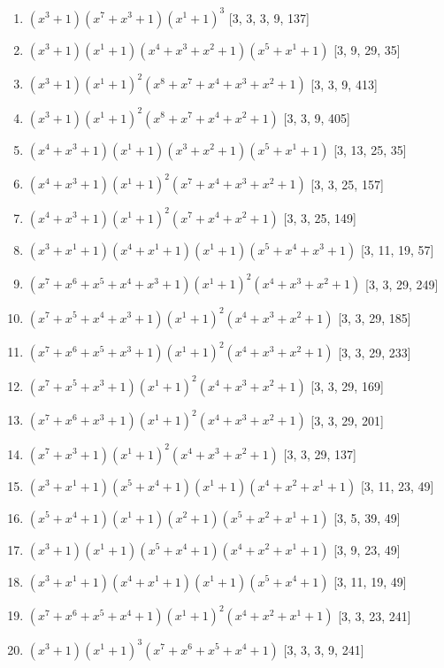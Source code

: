 \documentclass[10pt,twocolumn]{article}
\begin{document}
\begin{enumerate}
\item $(x^{3} + 1)(x^{7} + x^{3} + 1)(x^{1} + 1)^{3}$  [3, 3, 3, 9, 137]
\item $(x^{3} + 1)(x^{1} + 1)(x^{4} + x^{3} + x^{2} + 1)(x^{5} + x^{1} + 1)$  [3, 9, 29, 35]
\item $(x^{3} + 1)(x^{1} + 1)^{2}(x^{8} + x^{7} + x^{4} + x^{3} + x^{2} + 1)$  [3, 3, 9, 413]
\item $(x^{3} + 1)(x^{1} + 1)^{2}(x^{8} + x^{7} + x^{4} + x^{2} + 1)$  [3, 3, 9, 405]
\item $(x^{4} + x^{3} + 1)(x^{1} + 1)(x^{3} + x^{2} + 1)(x^{5} + x^{1} + 1)$  [3, 13, 25, 35]
\item $(x^{4} + x^{3} + 1)(x^{1} + 1)^{2}(x^{7} + x^{4} + x^{3} + x^{2} + 1)$  [3, 3, 25, 157]
\item $(x^{4} + x^{3} + 1)(x^{1} + 1)^{2}(x^{7} + x^{4} + x^{2} + 1)$  [3, 3, 25, 149]
\item $(x^{3} + x^{1} + 1)(x^{4} + x^{1} + 1)(x^{1} + 1)(x^{5} + x^{4} + x^{3} + 1)$  [3, 11, 19, 57]
\item $(x^{7} + x^{6} + x^{5} + x^{4} + x^{3} + 1)(x^{1} + 1)^{2}(x^{4} + x^{3} + x^{2} + 1)$  [3, 3, 29, 249]
\item $(x^{7} + x^{5} + x^{4} + x^{3} + 1)(x^{1} + 1)^{2}(x^{4} + x^{3} + x^{2} + 1)$  [3, 3, 29, 185]
\item $(x^{7} + x^{6} + x^{5} + x^{3} + 1)(x^{1} + 1)^{2}(x^{4} + x^{3} + x^{2} + 1)$  [3, 3, 29, 233]
\item $(x^{7} + x^{5} + x^{3} + 1)(x^{1} + 1)^{2}(x^{4} + x^{3} + x^{2} + 1)$  [3, 3, 29, 169]
\item $(x^{7} + x^{6} + x^{3} + 1)(x^{1} + 1)^{2}(x^{4} + x^{3} + x^{2} + 1)$  [3, 3, 29, 201]
\item $(x^{7} + x^{3} + 1)(x^{1} + 1)^{2}(x^{4} + x^{3} + x^{2} + 1)$  [3, 3, 29, 137]
\item $(x^{3} + x^{1} + 1)(x^{5} + x^{4} + 1)(x^{1} + 1)(x^{4} + x^{2} + x^{1} + 1)$  [3, 11, 23, 49]
\item $(x^{5} + x^{4} + 1)(x^{1} + 1)(x^{2} + 1)(x^{5} + x^{2} + x^{1} + 1)$  [3, 5, 39, 49]
\item $(x^{3} + 1)(x^{1} + 1)(x^{5} + x^{4} + 1)(x^{4} + x^{2} + x^{1} + 1)$  [3, 9, 23, 49]
\item $(x^{3} + x^{1} + 1)(x^{4} + x^{1} + 1)(x^{1} + 1)(x^{5} + x^{4} + 1)$  [3, 11, 19, 49]
\item $(x^{7} + x^{6} + x^{5} + x^{4} + 1)(x^{1} + 1)^{2}(x^{4} + x^{2} + x^{1} + 1)$  [3, 3, 23, 241]
\item $(x^{3} + 1)(x^{1} + 1)^{3}(x^{7} + x^{6} + x^{5} + x^{4} + 1)$  [3, 3, 3, 9, 241]

\end{enumerate}
\end{document}
